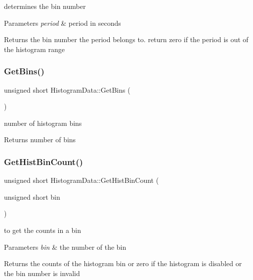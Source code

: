 determines the bin number 


\begin{DoxyParams}{Parameters}
{\em period} & period in seconds \\
\hline
\end{DoxyParams}
\begin{DoxyReturn}{Returns}
the bin number the period belongs to. return zero if the period is out of the histogram range 
\end{DoxyReturn}
\mbox{\label{classHistogramData_a9ee374cc3bab303463c9a7788b7e7b6f}} 
\subsubsection{\texorpdfstring{Get\+Bins()}{GetBins()}}
{\footnotesize\ttfamily unsigned short Histogram\+Data\+::\+Get\+Bins (\begin{DoxyParamCaption}{ }\end{DoxyParamCaption})}



number of histogram bins 

\begin{DoxyReturn}{Returns}
number of bins 
\end{DoxyReturn}
\mbox{\label{classHistogramData_a49e967388837f909afb328f9e55da205}} 
\subsubsection{\texorpdfstring{Get\+Hist\+Bin\+Count()}{GetHistBinCount()}}
{\footnotesize\ttfamily unsigned short Histogram\+Data\+::\+Get\+Hist\+Bin\+Count (\begin{DoxyParamCaption}\item[{unsigned short}]{bin }\end{DoxyParamCaption})}



to get the counts in a bin 


\begin{DoxyParams}{Parameters}
{\em bin} & the number of the bin \\
\hline
\end{DoxyParams}
\begin{DoxyReturn}{Returns}
the counts of the histogram bin or zero if the histogram is disabled or the bin number is invalid 
\end{DoxyReturn}
\mbox{\label{classHistogramData_a9f1db31342e0a70473c2ab61cc0e0f22}} 
